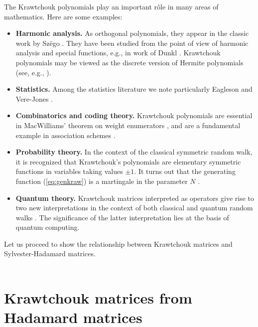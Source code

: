 \documentclass[12pt]{article}
\numberwithin{equation}{section}
\begin{document}
The Krawtchouk polynomials play an important r\^ole in many 
areas of mathematics.  Here are some examples: 
\bigskip
\begin{itemize}
\item
{\bf Harmonic analysis. }
As orthogonal polynomials, they appear in the classic work by
Sz\"ego \cite{Sze}. %
They have been studied from the point of view of 
harmonic analysis and special functions, 
e.g., in work of Dunkl \cite{Dun, DR}. %
Krawtchouk polynomials may be viewed as the discrete version of 
Hermite polynomials (see, e.g., \cite{AW}). 
\\
\item
{\bf Statistics. } Among the statistics literature we note particularly Eagleson \cite{Eag} %
and  Vere-Jones \cite{V-J}. %
\\
\item
{\bf Combinatorics and coding theory. } Krawtchouk polynomials are essential in
MacWilliams' theorem on weight enumerators \cite{Lev,MS}, %
and are a fundamental example in association schemes \cite{Del1,Del2,Del3}.   %
\bigskip
\item
{\bf Probability theory. }
In the context of the classical symmetric random walk,
it is recognized that Krawtchouk's polynomials are elementary 
symmetric functions in variables taking values $\pm1$. 
It turns out that the generating function (\ref{eq:genkraw}) is a
martingale in the parameter $N$ \cite{FS}. %
\bigskip
\item
{\bf Quantum theory. } 
Krawtchouk matrices interpreted as operators give rise  
to two new interpretations in the context of
both classical and quantum random walks  \cite{FK}.
The significance of the latter interpretation lies at the basis of quantum computing. 
\end{itemize}

\bigskip


Let us proceed to show the relationship between Krawtchouk matrices 
and Sylvester-Hadamard matrices.
\\
\\

\section{Krawtchouk matrices from Hadamard matrices}
\label{sec:result}
\end{document}
